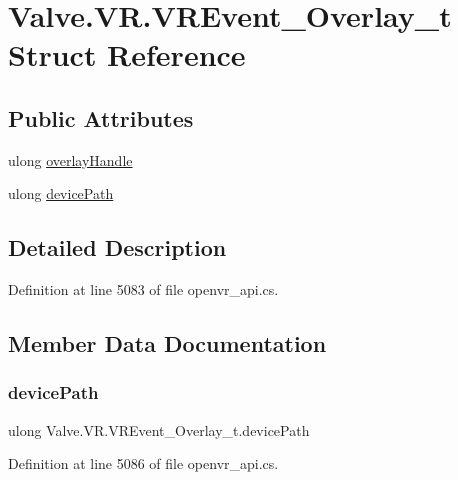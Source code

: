\hypertarget{struct_valve_1_1_v_r_1_1_v_r_event___overlay__t}{}\section{Valve.\+V\+R.\+V\+R\+Event\+\_\+\+Overlay\+\_\+t Struct Reference}
\label{struct_valve_1_1_v_r_1_1_v_r_event___overlay__t}
\subsection*{Public Attributes}
\begin{DoxyCompactItemize}
\item 
ulong \mbox{\hyperlink{struct_valve_1_1_v_r_1_1_v_r_event___overlay__t_a47c9422a80471b243315e1d15f722f00}{overlay\+Handle}}
\item 
ulong \mbox{\hyperlink{struct_valve_1_1_v_r_1_1_v_r_event___overlay__t_a0245f672a296312d2b7a2b6fa9ddf4dc}{device\+Path}}
\end{DoxyCompactItemize}


\subsection{Detailed Description}


Definition at line 5083 of file openvr\+\_\+api.\+cs.



\subsection{Member Data Documentation}
\mbox{\label{struct_valve_1_1_v_r_1_1_v_r_event___overlay__t_a0245f672a296312d2b7a2b6fa9ddf4dc}} 
\subsubsection{\texorpdfstring{devicePath}{devicePath}}
{\footnotesize\ttfamily ulong Valve.\+V\+R.\+V\+R\+Event\+\_\+\+Overlay\+\_\+t.\+device\+Path}



Definition at line 5086 of file openvr\+\_\+api.\+cs.

\mbox{\label{struct_valve_1_1_v_r_1_1_v_r_event___overlay__t_a47c9422a80471b243315e1d15f722f00}} 
